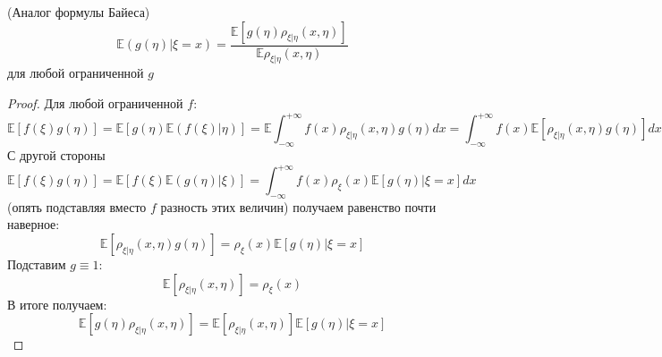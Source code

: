 \begin{theorem} (Аналог формулы Байеса) \\
\[
    \mathbb{E}\left(g\left(\eta\right) | \xi = x\right) = \frac{\mathbb{E}\left[g\left(\eta\right) \rho_{\xi | \eta}\left(x, \eta\right)\right]}{\mathbb{E} \rho_{\xi | \eta}\left(x, \eta\right)}
\]
для любой ограниченной $g$
\end{theorem}
\begin{proof}
Для любой ограниченной $f$:
\[
    \mathbb{E}\left[f\left(\xi\right)g\left(\eta\right)\right] = \mathbb{E}\left[g\left(\eta\right)\mathbb{E}\left(f\left(\xi\right) | \eta\right)\right] = \mathbb{E}\int_{-\infty}^{+\infty} f\left(x\right) \rho_{\xi | \eta}\left(x, \eta\right)g\left(\eta\right) dx = \int_{-\infty}^{+\infty} f\left(x\right)\mathbb{E} \left[\rho_{\xi | \eta}\left(x, \eta\right)g\left(\eta\right)\right] dx
\]
С другой стороны
\[
    \mathbb{E}\left[f\left(\xi\right)g\left(\eta\right)\right] = \mathbb{E}\left[f\left(\xi\right) \mathbb{E}\left(g\left(\eta\right) | \xi\right)\right] = \int_{-\infty}^{+\infty} f\left(x\right) \rho_{\xi}\left(x\right) \mathbb{E}\left[g\left(\eta\right) | \xi = x\right] dx
\]
(опять подставляя вместо $f$ разность этих величин) получаем равенство почти наверное:
 \[
    \mathbb{E} \left[\rho_{\xi | \eta}\left(x, \eta\right)g\left(\eta\right)\right] = \rho_{\xi}\left(x\right) \mathbb{E}\left[g\left(\eta\right) | \xi = x\right]
 \]
 Подставим $g \equiv 1$:
 \[
    \mathbb{E} \left[\rho_{\xi | \eta}\left(x, \eta\right)\right] = \rho_{\xi}\left(x\right)
 \]
 В итоге получаем:
 \[
     \mathbb{E}\left[g\left(\eta\right) \rho_{\xi | \eta}\left(x, \eta\right)\right] = 
     \mathbb{E} \left[\rho_{\xi | \eta}\left(x, \eta\right)\right]\mathbb{E}\left[g\left(\eta\right) | \xi = x\right]
 \]
\end{proof}


